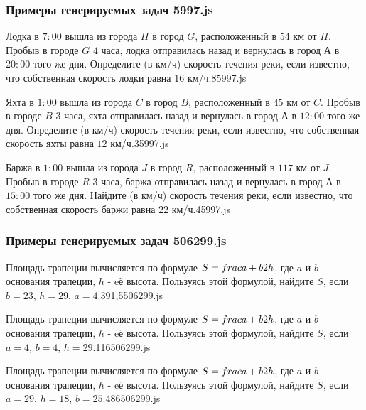 
\subsubsection*{Примеры генерируемых задач 5997.js}   

\par{Лодка в $7:00$ вышла из города $H$ в город $G$, расположенный в $54$ км от $H$. Пробыв в городе $G$ $4$ часа, лодка отправилась назад и вернулась в город $А$ в $20:00$ того же дня. Определите (в км/ч) скорость течения реки, если известно, что собственная скорость лодки равна $16$ км/ч.}{8}{5997.js}
\par{Яхта в $1:00$ вышла из города $C$ в город $B$, расположенный в $45$ км от $C$. Пробыв в городе $B$ $3$ часа, яхта отправилась назад и вернулась в город $А$ в $12:00$ того же дня. Определите (в км/ч) скорость течения реки, если известно, что собственная скорость яхты равна $12$ км/ч.}{3}{5997.js}
\par{Баржа в $1:00$ вышла из города $J$ в город $R$, расположенный в $117$ км от $J$. Пробыв в городе $R$ $3$ часа, баржа отправилась назад и вернулась в город $А$ в $15:00$ того же дня. Найдите (в км/ч) скорость течения реки, если известно, что собственная скорость баржи равна $22$ км/ч.}{4}{5997.js}	


\subsubsection*{Примеры генерируемых задач 506299.js}   

\par{Площадь трапеции вычисляется по формуле $S=\\frac{a+b}{2}h$, где $a$ и $b$ - основания трапеции, $h$ - eё высота. Пользуясь этой формулой, найдите $S$, если $b=23$, $h=29$, $a=4$.}{391,5}{506299.js}
\par{Площадь трапеции вычисляется по формуле $S=\\frac{a+b}{2}h$, где $a$ и $b$ - основания трапеции, $h$ - eё высота. Пользуясь этой формулой, найдите $S$, если $a=4$, $b=4$, $h=29$.}{116}{506299.js}
\par{Площадь трапеции вычисляется по формуле $S=\\frac{a+b}{2}h$, где $a$ и $b$ - основания трапеции, $h$ - eё высота. Пользуясь этой формулой, найдите $S$, если $a=29$, $h=18$, $b=25$.}{486}{506299.js}
